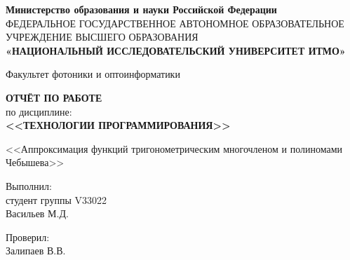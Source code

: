 \thispagestyle{empty}

\begin{center}
    \textbf{Министерство образования и науки Российской Федерации} \\
    ФЕДЕРАЛЬНОЕ ГОСУДАРСТВЕННОЕ АВТОНОМНОЕ ОБРАЗОВАТЕЛЬНОЕ УЧРЕЖДЕНИЕ ВЫСШЕГО ОБРАЗОВАНИЯ \\
    \textbf{\small{«НАЦИОНАЛЬНЫЙ ИССЛЕДОВАТЕЛЬСКИЙ УНИВЕРСИТЕТ ИТМО»}}
    \end{center}
    
\begin{center}
    Факультет фотоники и оптоинформатики
\end{center}

\vspace{0.1\paperheight}

\begin{center}
    \textbf{ОТЧЁТ ПО РАБОТЕ} \\
    по дисциплине: \\
    \textbf{<<ТЕХНОЛОГИИ ПРОГРАММИРОВАНИЯ>>}
\end{center}

\begin{center}
    <<Аппроксимация функций тригонометрическим многочленом и полиномами Чебышева>>
\end{center}

\vspace{0.1\paperheight}

\begin{flushright}
    Выполнил: \\
    студент группы V33022 \\
    Васильев М.Д.
\end{flushright}

\begin{flushright}
    Проверил: \\
    Залипаев В.В.
\end{flushright}

\vspace{0pt plus4fill}

\newpage